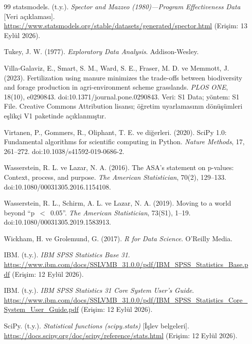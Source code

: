 \begin{thebibliography}{99}
statsmodels. (t.y.). \textit{Spector and Mazzeo (1980)---Program
Effectiveness Data} [Veri açıklaması].
\url{https://www.statsmodels.org/stable/datasets/generated/spector.html}
(Erişim: 13 Eylül 2026).

Tukey, J. W. (1977).
\textit{Exploratory Data Analysis}. Addison-Wesley.

Villa-Galaviz, E., Smart, S. M., Ward, S. E., Fraser, M. D. ve Memmott, J.
(2023). Fertilization using manure minimizes the trade-offs between
biodiversity and forage production in agri-environment scheme grasslands.
\textit{PLOS ONE}, 18(10), e0290843.
doi:10.1371/journal.pone.0290843. Veri: S1 Data; yöntem: S1 File.
Creative Commons Attribution lisansı; öğretim uyarlamasının dönüşümleri
eşlikçi V1 paketinde açıklanmıştır.

Virtanen, P., Gommers, R., Oliphant, T. E. ve diğerleri. (2020). SciPy 1.0:
Fundamental algorithms for scientific computing in Python.
\textit{Nature Methods}, 17, 261--272.
doi:10.1038/s41592-019-0686-2.

Wasserstein, R. L. ve Lazar, N. A. (2016). The ASA's statement on p-values:
Context, process, and purpose. \textit{The American Statistician}, 70(2),
129--133. doi:10.1080/00031305.2016.1154108.

Wasserstein, R. L., Schirm, A. L. ve Lazar, N. A. (2019). Moving to a world
beyond ``p~$<$~0.05''. \textit{The American Statistician}, 73(S1), 1--19.
doi:10.1080/00031305.2019.1583913.

Wickham, H. ve Grolemund, G. (2017).
\textit{R for Data Science}. O'Reilly Media.

IBM. (t.y.). \textit{IBM SPSS Statistics Base 31}.
\url{https://www.ibm.com/docs/SSLVMB_31.0.0/pdf/IBM_SPSS_Statistics_Base.pdf}
(Erişim: 12 Eylül 2026).

IBM. (t.y.). \textit{IBM SPSS Statistics 31 Core System User's Guide}.
\url{https://www.ibm.com/docs/SSLVMB_31.0.0/pdf/IBM_SPSS_Statistics_Core_System_User_Guide.pdf}
(Erişim: 12 Eylül 2026).

SciPy. (t.y.). \textit{Statistical functions (scipy.stats)} [İşlev belgeleri].
\url{https://docs.scipy.org/doc/scipy/reference/stats.html}
(Erişim: 12 Eylül 2026).



\end{thebibliography}